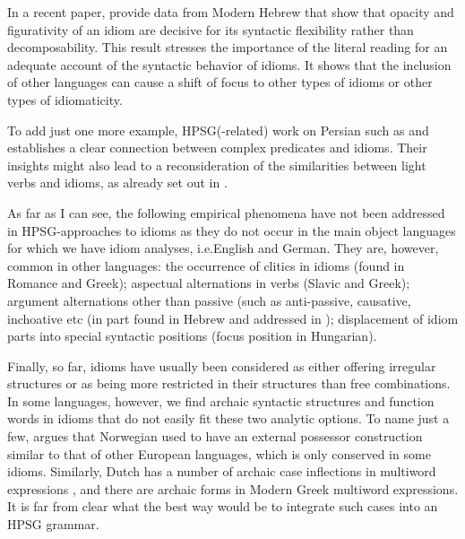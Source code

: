 \documentclass[output=paper]{langsci/langscibook}
\begin{document}
In a recent paper, \cite{Sheinfux:al:18} provide data from Modern Hebrew that show that opacity and figurativity of an idiom are decisive for its syntactic flexibility rather than decomposability.
This result stresses the importance of the literal reading for an adequate account of the syntactic behavior of idioms. 
%
It shows that the inclusion of other languages can cause a shift of focus to other types of idioms or other types of idiomaticity. 

To add just one more example, HPSG(-related) work on Persian such as \cite{MuellerPersian-unlinked} and \cite{Samvelian:Faghiri:16} establishes a clear connection between complex predicates and idioms. 
Their insights might also lead to a reconsideration of the similarities between light verbs and idioms, as already set out in \cite{KE94a}.





As far as I can see, the following empirical phenomena have not been addressed in HPSG-approaches to idioms as they do not occur in the main object languages for which we have idiom analyses, i.e.\@ English and German. They are, however, common in other languages: the occurrence of clitics in idioms (found in Romance and Greek); aspectual alternations in verbs (Slavic and Greek); argument alternations other than passive (such as anti-passive, causative, inchoative etc
(in part found in Hebrew and addressed in \cite{Sheinfux:al:18}); 
displacement of idiom parts into special syntactic positions (focus position in Hungarian). 

Finally, so far, idioms have usually been considered as either offering irregular structures or as being more restricted in their structures than free combinations. In some languages, however, we find archaic syntactic structures and function words in idioms that do not easily fit these two analytic options. To name just a few, \cite{Lodrup:09} argues that Norwegian used to have an external possessor construction similar to that of other European languages, which is only conserved in some idioms. Similarly, Dutch has a number of archaic case inflections in multiword expressions \citep[]{Kuiper:18}, and there are archaic forms in Modern Greek multiword expressions. It is far from clear what the best way would be to integrate such cases into an HPSG grammar. 
\end{document}
